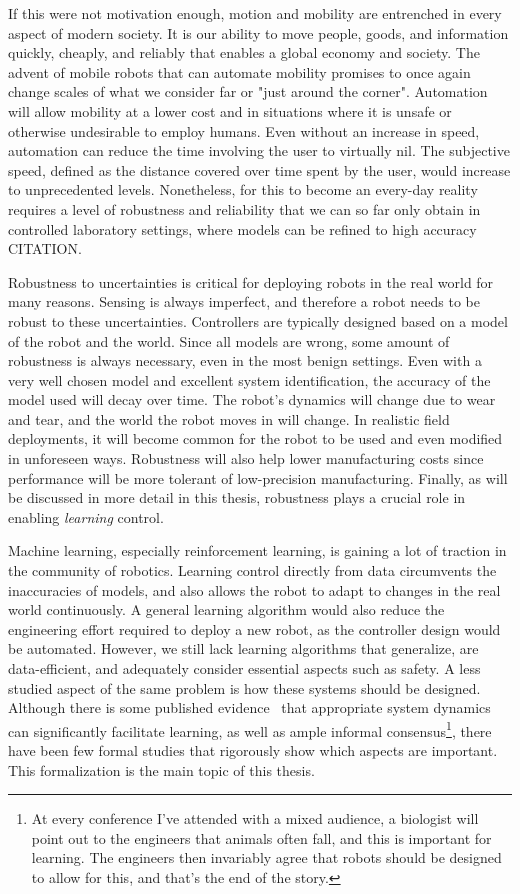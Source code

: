 If this were not motivation enough, motion and mobility are entrenched in every aspect of modern society. It is our ability to move people, goods, and information quickly, cheaply, and reliably that enables a global economy and society. The advent of mobile robots that can automate mobility promises to once again change scales of what we consider far or "just around the corner". Automation will allow mobility at a lower cost and in situations where it is unsafe or otherwise undesirable to employ humans. Even without an increase in speed, automation can reduce the time involving the user to virtually nil. The subjective speed, defined as the distance covered over time spent by the user, would increase to unprecedented levels. Nonetheless, for this to become an every-day reality requires a level of robustness and reliability that we can so far only obtain in controlled laboratory settings, where models can be refined to high accuracy CITATION. \par

Robustness to uncertainties is critical for deploying robots in the real world for many reasons.
Sensing is always imperfect, and therefore a robot needs to be robust to these uncertainties.
Controllers are typically designed based on a model of the robot and the world. Since all models are wrong, some amount of robustness is always necessary, even in the most benign settings.
Even with a very well chosen model and excellent system identification, the accuracy of the model used will decay over time.
The robot's dynamics will change due to wear and tear, and the world the robot moves in will change.
In realistic field deployments, it will become common for the robot to be used and even modified in unforeseen ways.
Robustness will also help lower manufacturing costs since performance will be more tolerant of low-precision manufacturing.
Finally, as will be discussed in more detail in this thesis, robustness plays a crucial role in enabling \emph{learning} control.
\par
Machine learning, especially reinforcement learning, is gaining a lot of traction in the community of robotics. Learning control directly from data circumvents the inaccuracies of models, and also allows the robot to adapt to changes in the real world continuously.
A general learning algorithm would also reduce the engineering effort required to deploy a new robot, as the controller design would be automated.
However, we still lack learning algorithms that generalize, are data-efficient, and adequately consider essential aspects such as safety.
A less studied aspect of the same problem is how these systems should be designed. Although there is some published evidence~\cite{tedrake2005learning, randlov2000shaping} that appropriate system dynamics can significantly facilitate learning, as well as ample informal consensus\footnote{At every conference I've attended with a mixed audience, a biologist will point out to the engineers that animals often fall, and this is important for learning. The engineers then invariably agree that robots should be designed to allow for this, and that's the end of the story.}, there have been few formal studies that rigorously show which aspects are important. This formalization is the main topic of this thesis.

